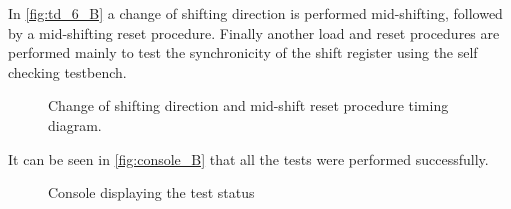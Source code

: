 \documentclass[10pt]{article}
\begin{document}
In \autoref{fig:td_6_B} a change of shifting direction is performed mid-shifting, followed by a mid-shifting reset procedure.
Finally another load and reset procedures are performed mainly to test the synchronicity of the shift register using the self checking testbench.
\begin{figure}[h!t]
    \centering
    \caption{Change of shifting direction and mid-shift reset procedure timing diagram.}
    \label{fig:td_6_B}
\end{figure}
\newpage
It can be seen in \autoref{fig:console_B} that all the tests were performed successfully. 
\begin{figure}[h!t]
    \centering
    \caption{Console displaying the test status}
    \label{fig:console_B}
\end{figure}

\newpage

\newpage
\end{document}
